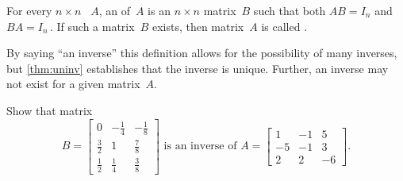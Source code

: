 \begin{definition}[inverse] \label{def:invertible} 
For every \(n\times n\) ~\(A\), an  of~\(A\) is an \(n\times n\) matrix~\(B\) such that both \(AB=I_n\) and \(BA=I_n\)\,.
If such a matrix~\(B\) exists, then matrix~\(A\) is called .
\end{definition}

By saying ``an inverse'' this definition allows for the possibility of many inverses, but \cref{thm:uninv} establishes that the inverse is unique.
Further, an inverse may not exist for a given matrix~\(A\).

\begin{example} \label{eg:a3x3inv}
Show that matrix
\begin{equation*}
B=\begin{bmatrix} 0&-\frac14&-\frac18\\\frac32&1&\frac78\\ \frac12&\frac14&\frac38 \end{bmatrix}
\text{ is an inverse of }
A=\begin{bmatrix} 1&-1&5\\-5&-1&3\\2&2&-6 \end{bmatrix}.
\end{equation*}


\end{example}
